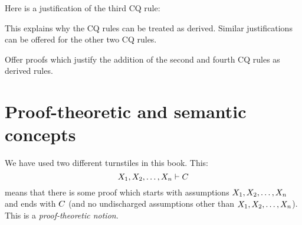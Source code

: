 \begin{pf}
\open
{}
\open
{}
\open
{}
\close
{}
\close
{}
\LEM
\close
{}
\end{pf}


Here is a justification of the third CQ rule:

\begin{pf}
\open
{}
\open
{}
\open
{}

\close
{}
\close
{}
\LEM
\close
{}
\end{pf}


This explains why the CQ rules can be treated as derived. Similar justifications can be offered for the other two CQ rules.

\begin{practiceproblems}

\problempart
Offer proofs which justify the addition of the second and fourth CQ rules as derived rules.


\end{practiceproblems}

\chapter{Proof-theoretic and semantic concepts}
We have used two different turnstiles in this book.  This:
$$X_1, X_2, \ldots, X_n \vdash C$$
means that there is some proof which starts with assumptions $X_1, X_2, \ldots, X_n$ and ends with $C$ (and no undischarged assumptions other than $X_1, X_2, \ldots, X_n$). This is a \emph{proof-theoretic notion}.

